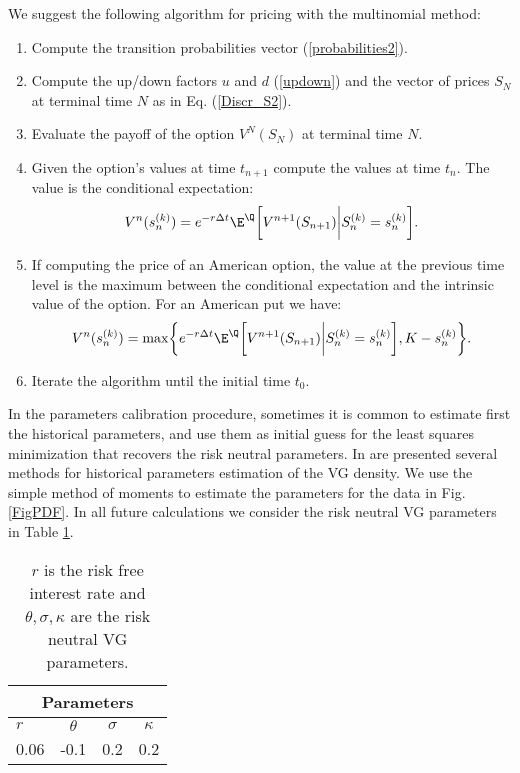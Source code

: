 We suggest the following algorithm for pricing with the multinomial method:
\begin{enumerate}
 \item Compute the transition probabilities vector (\ref{probabilities2}). 
 \item Compute the up/down factors $u$ and $d$ (\ref{updown}) and the vector of prices $S_N$ at terminal time $N$ as in Eq. (\ref{Discr_S2}).
 \item Evaluate the payoff of the option $V^N(S_N)$ at terminal time $N$.
 \item Given the option's values at time $t_{n+1}$ compute the values at time $t_n$. The value is the conditional expectation:
 \begin{equation}
 V^n(s^{(k)}_n) = e^{-r\Delta t} \E^{\Q} \biggl[ V^{n+1}(S_{n+1}) \bigg| S^{(k)}_n = s^{(k)}_n \biggr]. 
\end{equation}
 \item If computing the price of an American option, the value at the previous time level is the maximum between the conditional expectation and
 the intrinsic value of the option. For an American put we have:
 \begin{equation}
 V^n(s^{(k)}_n) = \max \biggr \{ e^{-r\Delta t} \E^{\Q} \biggl[ V^{n+1}(S_{n+1}) \bigg| S^{(k)}_n = s^{(k)}_n \biggr] , K-s^{(k)}_n \biggr \}. 
\end{equation}	
 \item Iterate the algorithm until the initial time $t_0$. 
\end{enumerate}
In the parameters calibration procedure, sometimes it is common to estimate first the historical parameters, and use them as initial guess for the
least squares minimization that recovers the risk neutral parameters.
In \cite{Se04} are presented several methods for historical parameters estimation of the VG density. We use the simple method of moments to estimate the 
parameters for the data in Fig. \ref{FigPDF}.
In all future calculations we consider the risk neutral VG parameters in Table \ref{sample-table}.

\begin{table}[!h]
\centering
{\begin{tabular}{||l|c|c|c||}
\hline
 \multicolumn{4}{|c|}{Parameters} \\
\hline
$r$ & $\theta$ & $\sigma$ & $\kappa$ \\ 
0.06 & -0.1 & 0.2 & 0.2 \\
\hline
\end{tabular}}
\caption{$r$ is the risk free interest rate and $\theta, \sigma, \kappa$ are the risk neutral VG parameters.}
\label{sample-table}
\end{table}



